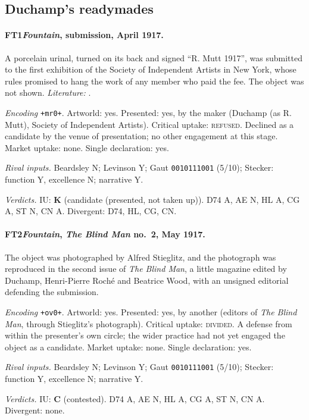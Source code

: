 \subsection{Duchamp's readymades}

\paragraph{FT1\enspace \emph{Fountain}, submission, April 1917.}
A porcelain urinal, turned on its back and signed \enquote{R. Mutt 1917}, was submitted to the first exhibition of the Society of Independent Artists in New York, whose rules promised to hang the work of any member who paid the fee. The object was not shown. \textit{Literature:} \citet{deDuve1996}.\par
\noindent\textit{Encoding} \texttt{+mr0+}. Artworld: yes. Presented: yes, by the maker (Duchamp (as R. Mutt), Society of Independent Artists). Critical uptake: \textsc{refused}. Declined as a candidate by the venue of presentation; no other engagement at this stage. Market uptake: none. Single declaration: yes.\par
\noindent\textit{Rival inputs.} Beardsley N; Levinson Y; Gaut \texttt{0010111001} (5/10); Stecker: function Y, excellence N; narrative Y.\par
\noindent\textit{Verdicts.} IU: \textbf{K} (candidate (presented, not taken up)). D74 A, AE N, HL A, CG A, ST N, CN A. Divergent: D74, HL, CG, CN.\par

\paragraph{FT2\enspace \emph{Fountain}, \emph{The Blind Man} no.~2, May 1917.}
The object was photographed by Alfred Stieglitz, and the photograph was reproduced in the second issue of \emph{The Blind Man}, a little magazine edited by Duchamp, Henri-Pierre Roch\'e and Beatrice Wood, with an unsigned editorial defending the submission.\par
\noindent\textit{Encoding} \texttt{+ov0+}. Artworld: yes. Presented: yes, by another (editors of \emph{The Blind Man}, through Stieglitz's photograph). Critical uptake: \textsc{divided}. A defense from within the presenter's own circle; the wider practice had not yet engaged the object as a candidate. Market uptake: none. Single declaration: yes.\par
\noindent\textit{Rival inputs.} Beardsley N; Levinson Y; Gaut \texttt{0010111001} (5/10); Stecker: function Y, excellence N; narrative Y.\par
\noindent\textit{Verdicts.} IU: \textbf{C} (contested). D74 A, AE N, HL A, CG A, ST N, CN A. Divergent: none.\par

